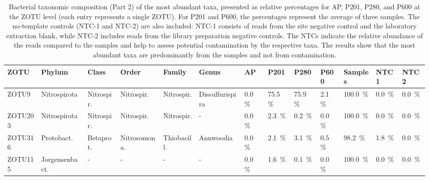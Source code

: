 \begin{table}
\centering
\begin{adjustbox}{max width=0.7\textwidth, max totalheight=0.85\textheight, keepaspectratio}
\renewcommand{\arraystretch}{1.5} %
\footnotesize %
\caption{Bacterial taxonomic composition (Part 2) of the most abundant taxa, presented as relative percentages for AP, P201, P280, and P600 at the ZOTU level (each entry represents a single ZOTU).
For P201 and P600, the percentages represent the average of three samples.
The no-template controls (NTC-1 and NTC-2) are also included: NTC-1 consists of reads from the site negative control and the laboratory extraction blank, while NTC-2 includes reads from the library preparation negative controls.
The NTCs indicate the relative abundance of the reads compared to the samples and help to assess potential contamination by the respective taxa.
The results show that the most abundant taxa are predominantly from the samples and not from contamination.}
\label{tabSI:tax_bac_2}
\begin{tabular}{llllllllll||lll}
\toprule
\textbf{ZOTU} & \textbf{Phylum} & \textbf{Class} & \textbf{Order} & \textbf{Family} & \textbf{Genus} & \textbf{AP} & \textbf{P201} & \textbf{P280} & \textbf{P600} & \textbf{Samples} & \textbf{NTC1} & \textbf{NTC2} \\
\midrule
ZOTU9   & Nitrospirota   & Nitrospir.     & Nitrospir.     & Nitrospir.       & Dissulfurispira & \SI{0.0}{\percent}   & \SI{75.5}{\percent} & \SI{75.9}{\percent} & \SI{2.1}{\percent}   & \SI{100.0}{\percent} & \SI{0.0}{\percent}  & \SI{0.0}{\percent} \\
ZOTU203 & Nitrospirota   & Nitrospir.     & Nitrospir.     & Nitrospir.       & -            & \SI{0.0}{\percent}   & \SI{2.3}{\percent}  & \SI{0.2}{\percent}  & \SI{0.0}{\percent}   & \SI{100.0}{\percent} & \SI{0.0}{\percent}  & \SI{0.0}{\percent} \\
ZOTU316 & Protobact.     & Betaprot.      & Nitrosomona.   & Thiobacill.     & Annwoodia     & \SI{0.0}{\percent}   & \SI{2.1}{\percent}  & \SI{3.1}{\percent}  & \SI{0.5}{\percent}   & \SI{98.2}{\percent}  & \SI{1.8}{\percent}  & \SI{0.0}{\percent} \\
ZOTU115 & Jorgensenbact. & -              & -              & -                & -            & \SI{0.0}{\percent}   & \SI{1.6}{\percent}  & \SI{0.1}{\percent}  & \SI{0.0}{\percent}   & \SI{100.0}{\percent} & \SI{0.0}{\percent}  & \SI{0.0}{\percent} \\

\end{tabular}
\end{adjustbox}
\end{table}
